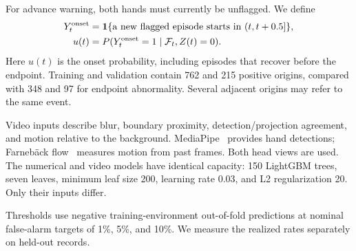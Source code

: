 For advance warning, both hands must currently be unflagged. We define
\begin{equation}
\begin{aligned}
Y^{\mathrm{onset}}_t&=\mathbf{1}\{\text{a new flagged episode starts in }(t,t+0.5]\},\\
u(t)&=P(Y^{\mathrm{onset}}_t=1\mid\mathcal{F}_t,Z(t)=0).
\end{aligned}
\label{eq:onset}
\end{equation}
\noindent Here $u(t)$ is the onset probability, including episodes that recover before the endpoint. Training and validation contain 762 and 215 positive origins, compared with 348 and 97 for endpoint abnormality. Several adjacent origins may refer to the same event.

Video inputs describe blur, boundary proximity, detection/projection agreement, and motion relative to the background. MediaPipe~\cite{mediapipe} provides hand detections; Farneb\"ack flow~\cite{farneback} measures motion from past frames. Both head views are used. The numerical and video models have identical capacity: 150 LightGBM trees, seven leaves, minimum leaf size 200, learning rate 0.03, and L2 regularization 20. Only their inputs differ.

Thresholds use negative training-environment out-of-fold predictions at nominal false-alarm targets of 1\%, 5\%, and 10\%. We measure the realized rates separately on held-out records.
